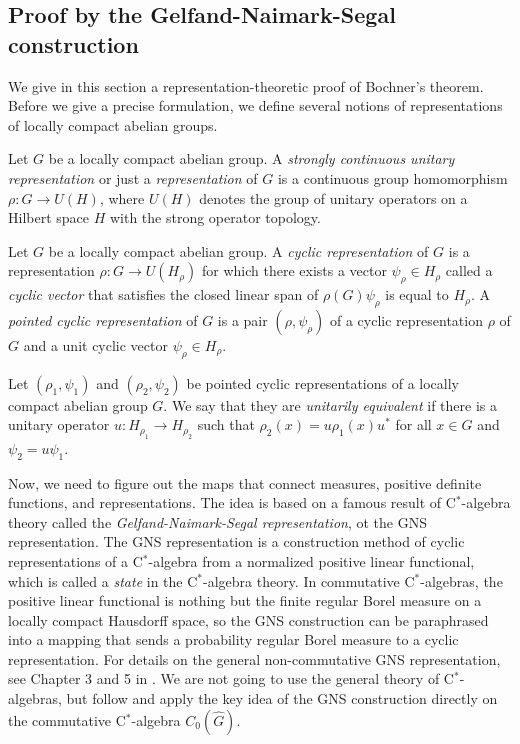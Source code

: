 \documentclass{../../small}
\begin{document}
\subsection{Proof by the Gelfand-Naimark-Segal construction}

We give in this section a representation-theoretic proof of Bochner's theorem.
Before we give a precise formulation, we define several notions of representations of locally compact abelian groups.

\begin{defn}
Let $G$ be a locally compact abelian group.
A \emph{strongly continuous unitary representation} or just a \emph{representation} of $G$ is a continuous group homomorphism $\rho:G\to U(H)$, where $U(H)$ denotes the group of unitary operators on a Hilbert space $H$ with the strong operator topology.
\end{defn}

\begin{defn}
Let $G$ be a locally compact abelian group.
A \emph{cyclic representation} of $G$ is a representation $\rho:G\to U(H_\rho)$ for which there exists a vector $\psi_\rho\in H_\rho$ called a \emph{cyclic vector} that satisfies the closed linear span of $\rho(G)\psi_\rho$ is equal to $H_\rho$.
A \emph{pointed cyclic representation} of $G$ is a pair $(\rho,\psi_\rho)$ of a cyclic representation $\rho$ of $G$ and a unit cyclic vector $\psi_\rho\in H_\rho$.
\end{defn}

\begin{defn}
Let $(\rho_1,\psi_1)$ and $(\rho_2,\psi_2)$ be pointed cyclic representations of a locally compact abelian group $G$.
We say that they are \emph{unitarily equivalent} if there is a unitary operator $u:H_{\rho_1}\to H_{\rho_2}$ such that $\rho_2(x)=u\rho_1(x)u^*$ for all $x\in G$ and $\psi_2=u\psi_1$.
\end{defn}

Now, we need to figure out the maps that connect measures, positive definite functions, and representations.
The idea is based on a famous result of C$^*$-algebra theory called the \emph{Gelfand-Naimark-Segal representation}, ot the GNS representation.
The GNS representation is a construction method of cyclic representations of a C$^*$-algebra from a normalized positive linear functional, which is called a \emph{state} in the C$^*$-algebra theory.
In commutative C$^*$-algebras, the positive linear functional is nothing but the finite regular Borel measure on a locally compact Hausdorff space, so the GNS construction can be paraphrased into a mapping that sends a probability regular Borel measure to a cyclic representation.
For details on the general non-commutative GNS representation, see Chapter 3 and 5 in \cite{murphy2014c}.
We are not going to use the general theory of C$^*$-algebras, but follow and apply the key idea of the GNS construction directly on the commutative C$^*$-algebra $C_0(\hat G)$.
\end{document}

